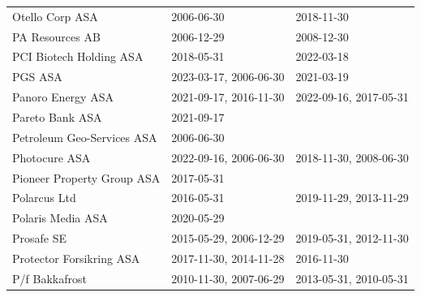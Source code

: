 \begin{table}[H]
\begin{tabularx}{\textwidth}{XXX}
Otello Corp ASA & 2006-06-30 & 2018-11-30 \\ 
PA Resources AB & 2006-12-29 & 2008-12-30 \\ 
PCI Biotech Holding ASA & 2018-05-31 & 2022-03-18 \\ 
PGS ASA & 2023-03-17, 2006-06-30 & 2021-03-19 \\ 
Panoro Energy ASA & 2021-09-17, 2016-11-30 & 2022-09-16, 2017-05-31 \\ 
Pareto Bank ASA & 2021-09-17 &  \\ 
Petroleum Geo-Services ASA & 2006-06-30 &  \\ 
Photocure ASA & 2022-09-16, 2006-06-30 & 2018-11-30, 2008-06-30 \\ 
Pioneer Property Group ASA & 2017-05-31 &  \\ 
Polarcus Ltd & 2016-05-31 & 2019-11-29, 2013-11-29 \\ 
Polaris Media ASA & 2020-05-29 &  \\ 
Prosafe SE & 2015-05-29, 2006-12-29 & 2019-05-31, 2012-11-30 \\ 
Protector Forsikring ASA & 2017-11-30, 2014-11-28 & 2016-11-30 \\ 
P/f Bakkafrost & 2010-11-30, 2007-06-29 & 2013-05-31, 2010-05-31 \\ 
\bottomrule
\end{tabularx}
\end{table}
\newpage
\clearpage

